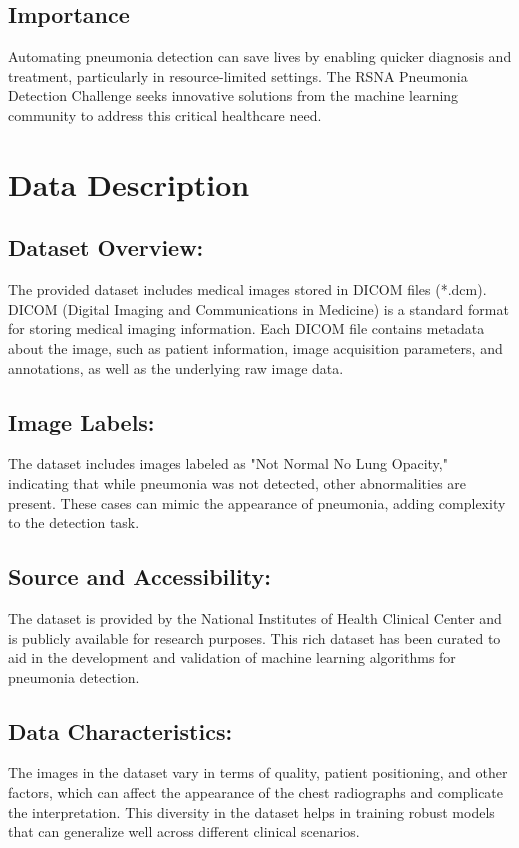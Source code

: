 \subsection{Importance}
\label{subsec:chap1 section 1.4}
Automating pneumonia detection can save lives by enabling quicker diagnosis and treatment, particularly in resource-limited settings. The RSNA Pneumonia Detection Challenge seeks innovative solutions from the machine learning community to address this critical healthcare need.

\section{Data Description}
\label{sec:chap1 section 2}

\subsection{Dataset Overview:}
\label{subsec:chap1 section 2.1}

The provided dataset includes medical images stored in DICOM files (*.dcm). DICOM (Digital Imaging and Communications in Medicine) is a standard format for storing medical imaging information. Each DICOM file contains metadata about the image, such as patient information, image acquisition parameters, and annotations, as well as the underlying raw image data.

\subsection{Image Labels:}
\label{subsec:chap1 section 2.2}
The dataset includes images labeled as "Not Normal No Lung Opacity," indicating that while pneumonia was not detected, other abnormalities are present. These cases can mimic the appearance of pneumonia, adding complexity to the detection task.

\subsection{Source and Accessibility:}
\label{subsec:chap1 section 2.3}
The dataset is provided by the National Institutes of Health Clinical Center and is publicly available for research purposes. This rich dataset has been curated to aid in the development and validation of machine learning algorithms for pneumonia detection.

\subsection{Data Characteristics:}
\label{subsec:chap1 section 2.4}
The images in the dataset vary in terms of quality, patient positioning, and other factors, which can affect the appearance of the chest radiographs and complicate the interpretation. This diversity in the dataset helps in training robust models that can generalize well across different clinical scenarios.

